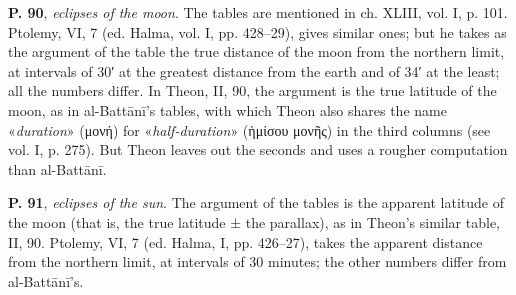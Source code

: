 \documentclass[11pt]{article}
\begin{document}
\par \textbf{P. 90}, \emph{eclipses of the moon}. The tables are mentioned in ch. XLIII, vol. I, p. 101. Ptolemy, VI, 7 (ed. Halma, vol. I, pp. 428–29), gives similar ones; but he takes as the argument of the table the true distance of the moon from the northern limit, at intervals of 30′ at the greatest distance from the earth and of 34′ at the least; all the numbers differ. In Theon, II, 90, the argument is the true latitude of the moon, as in al-Battānī's tables, with which Theon also shares the name «\emph{duration}» ({\greekfont μονή}) for «\emph{half-duration}» ({\greekfont ἡμίσου μονῆς}) in the third columns (see vol. I, p. 275). But Theon leaves out the seconds and uses a rougher computation than al-Battānī.\par
\par \textbf{P. 91}, \emph{eclipses of the sun}. The argument of the tables is the apparent latitude of the moon (that is, the true latitude ± the parallax), as in Theon's similar table, II, 90. Ptolemy, VI, 7 (ed. Halma, I, pp. 426–27), takes the apparent distance from the northern limit, at intervals of 30 minutes; the other numbers differ from al-Battānī's.\par
\end{document}
